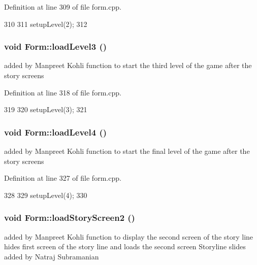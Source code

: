 Definition at line 309 of file form.cpp.


\begin{DoxyCode}
310 {
311     setupLevel(2);
312 }
\end{DoxyCode}
\hypertarget{class_form_abca8ff816e3230388fe64d31a0ba10be}{
\subsubsection[{loadLevel3}]{\setlength{\rightskip}{0pt plus 5cm}void Form::loadLevel3 ()}}
\label{class_form_abca8ff816e3230388fe64d31a0ba10be}
added by Manpreet Kohli function to start the third level of the game after the story screens 

Definition at line 318 of file form.cpp.


\begin{DoxyCode}
319 {
320    setupLevel(3);
321 }
\end{DoxyCode}
\hypertarget{class_form_a09242741a8ad563aec44c796dcec5a7c}{
\subsubsection[{loadLevel4}]{\setlength{\rightskip}{0pt plus 5cm}void Form::loadLevel4 ()}}
\label{class_form_a09242741a8ad563aec44c796dcec5a7c}
added by Manpreet Kohli function to start the final level of the game after the story screens 

Definition at line 327 of file form.cpp.


\begin{DoxyCode}
328 {
329     setupLevel(4);
330 }
\end{DoxyCode}
\hypertarget{class_form_a029cb26613cfb1d1ece1f403de8062aa}{
\subsubsection[{loadStoryScreen2}]{\setlength{\rightskip}{0pt plus 5cm}void Form::loadStoryScreen2 ()}}
\label{class_form_a029cb26613cfb1d1ece1f403de8062aa}
added by Manpreet Kohli function to display the second screen of the story line hides first screen of the story line and loads the second screen Storyline slides added by Natraj Subramanian 

